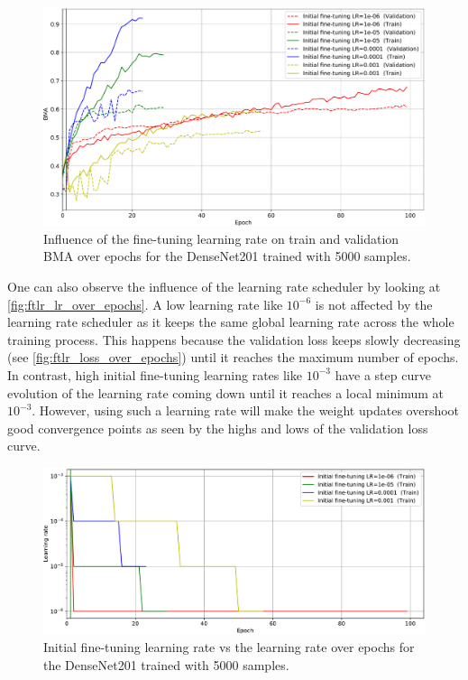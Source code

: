     \begin{figure}[ht]
        \centering
        \includegraphics[width=\textwidth]{figs/densenet201_ftlr_bma_over_epochs.pdf}
        \caption{Influence of the fine-tuning learning rate on train and validation \ac{BMA} over epochs for the DenseNet201 trained with 5000 samples.}
        \label{fig:ftlr_bma_over_epochs}
    \end{figure}
    
    One can also observe the influence of the learning rate scheduler by looking at \autoref{fig:ftlr_lr_over_epochs}. A low learning rate like $10^{-6}$ is not affected by the learning rate scheduler as it keeps the same global learning rate across the whole training process. This happens because the validation loss keeps slowly decreasing (see \autoref{fig:ftlr_loss_over_epochs}) until it reaches the maximum number of epochs. In contrast, high initial fine-tuning learning rates like $10^{-3}$ have a step curve evolution of the learning rate coming down until it reaches a local minimum at $10^{-3}$. However, using such a learning rate will make the weight updates overshoot good convergence points as seen by the highs and lows of the validation loss curve. \par  
    
    \begin{figure}[ht]
        \centering
        \includegraphics[width=\textwidth]{figs/densenet201_ftlr_lr_over_epochs.pdf}
        \caption{Initial fine-tuning learning rate vs the learning rate over epochs for the DenseNet201 trained with 5000 samples.}
        \label{fig:ftlr_lr_over_epochs}
    \end{figure}
    
